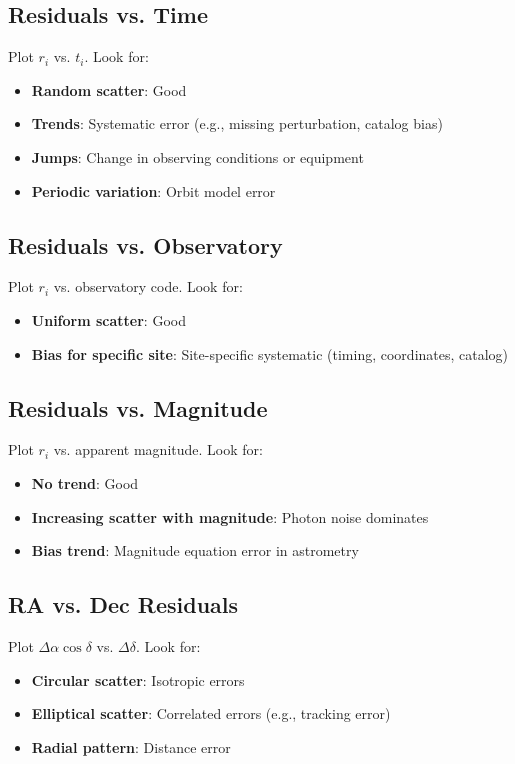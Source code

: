 \subsection{Residuals vs. Time}

Plot $r_i$ vs. $t_i$. Look for:
\begin{itemize}
    \item \textbf{Random scatter}: Good
    \item \textbf{Trends}: Systematic error (e.g., missing perturbation, catalog bias)
    \item \textbf{Jumps}: Change in observing conditions or equipment
    \item \textbf{Periodic variation}: Orbit model error
\end{itemize}

\subsection{Residuals vs. Observatory}

Plot $r_i$ vs. observatory code. Look for:
\begin{itemize}
    \item \textbf{Uniform scatter}: Good
    \item \textbf{Bias for specific site}: Site-specific systematic (timing, coordinates, catalog)
\end{itemize}

\subsection{Residuals vs. Magnitude}

Plot $r_i$ vs. apparent magnitude. Look for:
\begin{itemize}
    \item \textbf{No trend}: Good
    \item \textbf{Increasing scatter with magnitude}: Photon noise dominates
    \item \textbf{Bias trend}: Magnitude equation error in astrometry
\end{itemize}

\subsection{RA vs. Dec Residuals}

Plot $\Delta\alpha \cos\delta$ vs. $\Delta\delta$. Look for:
\begin{itemize}
    \item \textbf{Circular scatter}: Isotropic errors
    \item \textbf{Elliptical scatter}: Correlated errors (e.g., tracking error)
    \item \textbf{Radial pattern}: Distance error
\end{itemize}

